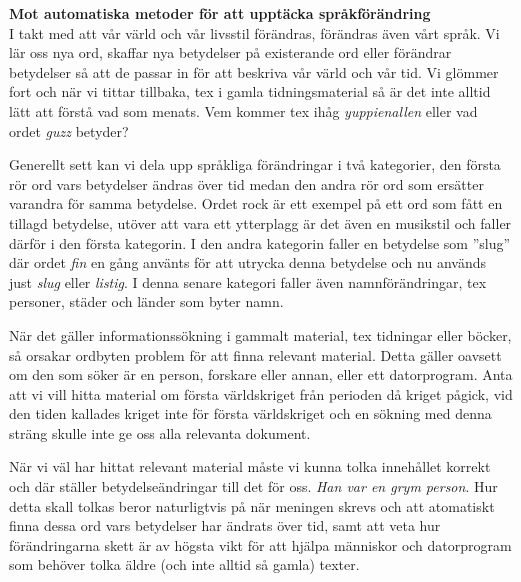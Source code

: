 \documentclass[11pt,twoside,a4paper]{article}
\begin{document}
\noindent \textbf{Mot automatiska metoder för att upptäcka språkförändring}\\

I takt med att vår värld och vår livsstil förändras, förändras även vårt språk. Vi lär oss nya ord, skaffar nya betydelser på existerande ord eller förändrar betydelser så att de passar in för att beskriva vår värld och vår tid. Vi glömmer fort och när vi tittar tillbaka, tex i gamla tidningsmaterial så är det inte alltid lätt att förstå vad som menats. Vem kommer tex ihåg \textit{yuppienallen} eller vad ordet \textit{guzz} betyder?

Generellt sett kan vi dela upp språkliga förändringar i två kategorier, den första rör ord vars betydelser ändras över tid medan den andra rör ord som ersätter varandra för samma betydelse. Ordet rock är ett exempel på ett ord som fått en tillagd betydelse, utöver att vara ett ytterplagg är det även en musikstil och faller därför i den första kategorin. I den andra kategorin faller en betydelse som ”slug” där ordet \textit{fin} en gång använts för att utrycka denna betydelse och nu används just \textit{slug} eller \textit{listig}. I denna senare kategori faller även namnförändringar, tex personer, städer och länder som byter namn.

När det gäller informationssökning i gammalt material, tex tidningar eller böcker, så orsakar ordbyten problem för att finna relevant material. Detta gäller oavsett om den som söker är en person, forskare eller annan, eller ett datorprogram. Anta att vi vill hitta material om första världskriget från perioden då kriget pågick, vid den tiden kallades kriget inte för första världskriget och en sökning med denna sträng skulle inte ge oss alla relevanta dokument.

När vi väl har hittat relevant material måste vi kunna tolka innehållet korrekt och där ställer betydelseändringar till det för oss.\textit{ Han var en grym person}. Hur detta skall tolkas beror naturligtvis på när meningen skrevs och att atomatiskt finna dessa ord vars betydelser har ändrats över tid, samt att veta hur förändringarna skett är av högsta vikt för att hjälpa människor och datorprogram som behöver tolka äldre (och inte alltid så gamla) texter.
\end{document}

